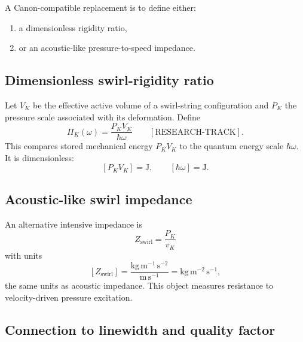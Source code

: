         A Canon-compatible replacement is to define either:
        
        \begin{enumerate}
            \item a dimensionless rigidity ratio,
            \item or an acoustic-like pressure-to-speed impedance.
        \end{enumerate}
    
    \subsection*{Dimensionless swirl-rigidity ratio}
        
        Let \(V_K\) be the effective active volume of a swirl-string configuration and \(P_K\) the pressure scale associated with its deformation. Define
        \begin{equation}
            \boxed{
                \Pi_K(\omega)
                =
                \frac{P_K V_K}{\hbar\omega}
            }
            \qquad
            [\mathrm{RESEARCH\text{-}TRACK}].
            \label{eq:dimensionless_swirl_rigidity}
        \end{equation}
        This compares stored mechanical energy \(P_KV_K\) to the quantum energy scale \(\hbar\omega\). It is dimensionless:
        \[
            [P_KV_K]=\mathrm{J},
            \qquad
            [\hbar\omega]=\mathrm{J}.
        \]
    
    \subsection*{Acoustic-like swirl impedance}
        
        An alternative intensive impedance is
        \begin{equation}
            \boxed{
                Z_{\mathrm{swirl}}
                =
                \frac{P_K}{v_K}
            }
            \label{eq:swirl_acoustic_impedance}
        \end{equation}
        with units
        \[
            [Z_{\mathrm{swirl}}]
            =
            \frac{\mathrm{kg\,m^{-1}\,s^{-2}}}{\mathrm{m\,s^{-1}}}
            =
            \mathrm{kg\,m^{-2}\,s^{-1}},
        \]
        the same units as acoustic impedance. This object measures resistance to velocity-driven pressure excitation.
    
    \subsection*{Connection to linewidth and quality factor}
        
